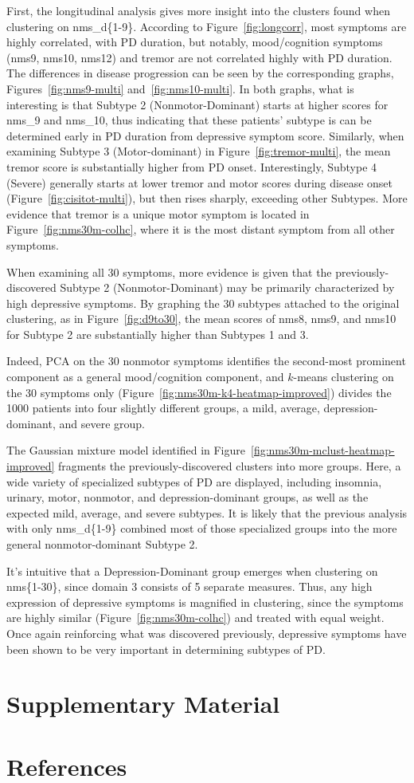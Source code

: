 \documentclass[preprint,3p,twocolumn]{elsarticle} %
\begin{document}
First, the longitudinal analysis gives more insight into the clusters found when clustering on
nms\_d\{1-9\}. According to Figure~\ref{fig:longcorr}, most symptoms are highly correlated, with PD
duration, but notably, mood/cognition symptoms (nms9, nms10, nms12) and tremor are not correlated
highly with PD duration. The differences in disease progression can be seen by the corresponding
graphs, Figures~\ref{fig:nms9-multi} and~\ref{fig:nms10-multi}. In both graphs, what is interesting
is that Subtype 2 (Nonmotor-Dominant) starts at higher scores for nms\_9 and nms\_10, thus
indicating that these patients' subtype is can be determined early in PD duration from depressive
symptom score. Similarly, when examining Subtype 3 (Motor-dominant) in
Figure~\ref{fig:tremor-multi}, the mean tremor score is substantially higher from PD onset.
Interestingly, Subtype 4 (Severe) generally starts at lower tremor and motor scores during disease
onset (Figure~\ref{fig:cisitot-multi}), but then rises sharply, exceeding other Subtypes. More evidence
that tremor is a unique motor symptom is located in Figure~\ref{fig:nms30m-colhc}, where it is the most
distant symptom from all other symptoms.

When examining all 30 symptoms, more evidence is given that the previously-discovered Subtype
2 (Nonmotor-Dominant) may be primarily characterized by high depressive symptoms. By graphing the
30 subtypes attached to the original clustering, as in Figure~\ref{fig:d9to30}, the mean scores of
nms8, nms9, and nms10 for Subtype 2 are substantially higher than Subtypes 1 and 3.

Indeed, PCA on the 30 nonmotor symptoms identifies the second-most prominent component as a general
mood/cognition component, and $k$-means clustering on the 30 symptoms only
(Figure~\ref{fig:nms30m-k4-heatmap-improved}) divides the 1000 patients into four slightly
different groups, a mild, average, depression-dominant, and severe group.

The Gaussian mixture model identified in Figure~\ref{fig:nms30m-mclust-heatmap-improved} fragments
the previously-discovered clusters into more groups. Here, a wide variety of specialized subtypes
of PD are displayed, including insomnia, urinary, motor, nonmotor, and depression-dominant groups,
as well as the expected mild, average, and severe subtypes. It is likely that the previous analysis
with only nms\_d\{1-9\} combined most of those specialized groups into the more general
nonmotor-dominant Subtype 2.

It's intuitive that a Depression-Dominant group emerges when clustering on nms\{1-30\}, since
domain 3 consists of 5 separate measures. Thus, any high expression of depressive symptoms is
magnified in clustering, since the symptoms are highly similar (Figure~\ref{fig:nms30m-colhc}) and
treated with equal weight. Once again reinforcing what was discovered previously, depressive
symptoms have been shown to be very important in determining subtypes of PD.

\section{Supplementary Material}
\section{References}


\end{document}
